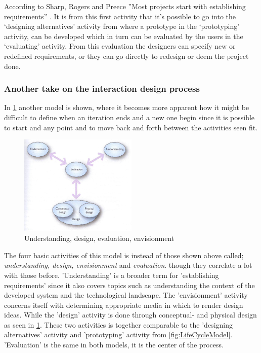 According to Sharp, Rogers and Preece ''Most projects start with establishing requirements'' \citep[p.~333]{InteractionDesign}. It is from this first activity that it’s possible to go into the ‘designing alternatives’ activity from where a prototype in the ‘prototyping’ activity, can be developed which in turn can be evaluated by the users in the ‘evaluating’ activity. From this evaluation the designers can specify new or redefined requirements, or they can go directly to redesign or deem the project done. 

\subsubsection{Another take on the interaction design process}\label{sec:Iterative2}
In \cref{fig:DEBModel} another model is shown, where it becomes more apparent how it might be difficult to define when an iteration ends and a new one begin since it is possible to start and any point and to move back and forth between the activities seen fit.

\begin{figure}[H]
	\centering
	\includegraphics[width=0.5\textwidth]{billeder/DEBModel.jpg}
	\caption{Understanding, design, evaluation, envisionment \citep[p.~49]{Benyon}}\label{fig:DEBModel}
\end{figure}

The four basic activities of this model is instead of those shown above called; \textit{understanding, design, envisionment} and \textit{evaluation}.
though they correlate a lot with those before. 
'Understanding' is a broader term for 'establishing requirements' since it also covers topics such as understanding the context of the developed system and the technological landscape.
The 'envisionment' activity concerns itself with determining appropriate media in which to render design ideas.
While the 'design' activity is done through conceptual- and physical design as seen in \cref{fig:DEBModel}.
These two activities is together comparable to the 'designing alternatives' activity and 'prototyping' activity from \cref{fig:LifeCycleModel}.
'Evaluation' is the same in both models, it is the center of the process.

